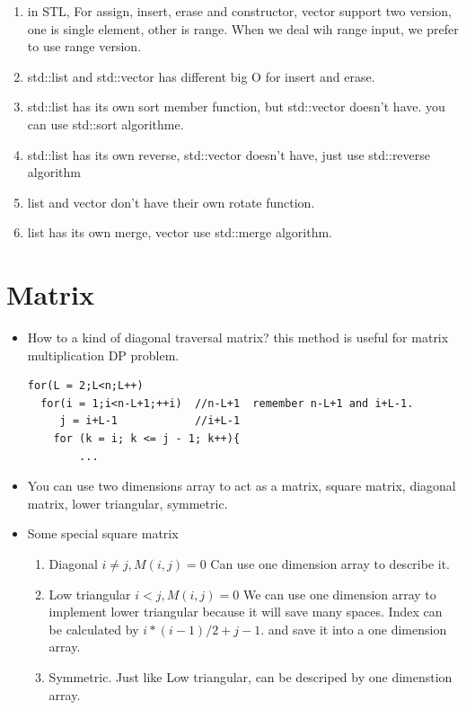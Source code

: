 \documentclass[a4paper,11pt,twoside]{book}
\begin{document}
\begin{itemize}
\begin{enumerate}
\item in STL,  For assign, insert, erase and constructor, vector support two version, one is single element, other is range.  When we deal wih range input, we prefer to use range version. 
\item std::list and std::vector has different big O for insert and erase.
\item std::list has its own sort member function, but std::vector doesn't have. you can use std::sort algorithme. 
\item std::list has its own reverse,  std::vector doesn't have, just use std::reverse algorithm
\item list and vector don't have their own rotate function.
\item list has its own merge, vector use std::merge algorithm.

\end{enumerate}

\end{itemize}

\section{Matrix}
\begin{itemize}
	
	\item How to a kind of diagonal traversal matrix? this method is useful for matrix multiplication DP problem. 
	
\begin{lstlisting}
for(L = 2;L<n;L++)
  for(i = 1;i<n-L+1;++i)  //n-L+1  remember n-L+1 and i+L-1. 
     j = i+L-1            //i+L-1
  	for (k = i; k <= j - 1; k++){
  		...
\end{lstlisting}
	
	\item You can use two dimensions array to act as a matrix, square matrix, diagonal matrix, lower triangular, symmetric. 
	
	\item Some special square matrix
	\begin{enumerate}
	\item Diagonal  $i\neq j, M(i,j) = 0$ Can use one dimension array to describe it. 
	
	\item Low triangular $i<j, M(i,j) = 0$ We can use one dimension array to implement lower triangular because it will save many spaces.  Index can be calculated by $i*(i-1)/2+j-1$. and save it into a one dimension array. 
	
	\item Symmetric. Just like Low triangular, can be descriped by one dimenstion array. 
	\end{enumerate}
\end{itemize}
\end{document}
